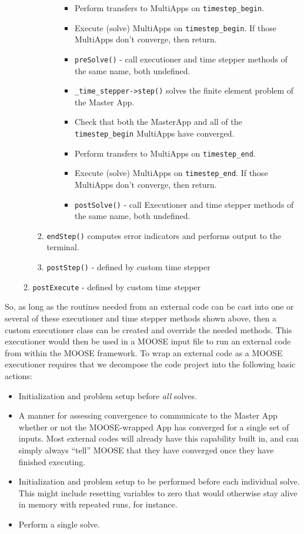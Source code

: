 \documentclass[10pt]{article}
\numberwithin{equation}{section} %
\begin{document}
\begin{enumerate}
\begin{enumerate}
\begin{enumerate}
\begin{enumerate}
				\begin{itemize}
				\item Perform transfers to MultiApps on {\tt timestep\_begin}.
				\item Execute (solve) MultiApps on {\tt timestep\_begin}. If those MultiApps don't converge, then return.
				\item {\tt preSolve()} - call executioner and time stepper methods of the same name, both undefined.
				\item {\tt \_time\_stepper->step()} solves the finite element problem of the Master App. 
				\item Check that both the MasterApp and all of the {\tt timestep\_begin} MultiApps have converged.
				\item Perform transfers to MultiApps on {\tt timestep\_end}.
				\item Execute (solve) MultiApps on {\tt timestep\_end}. If those MultiApps don't converge, then return.
				\item {\tt postSolve()} - call Executioner and time stepper methods of the same name, both undefined.
				\end{itemize}
			\end{enumerate}
		\item {\tt endStep()} computes error indicators and performs output to the terminal. 
		\item {\tt postStep()} - defined by custom time stepper
		\end{enumerate}
	\item {\tt postExecute} - defined by custom time stepper
	\end{enumerate}
\end{enumerate}

So, as long as the routines needed from an external code can be cast into one or several of these executioner and time stepper methods shown above, then a custom executioner class can be created and override the needed methods. This executioner would then be used in a MOOSE input file to run an external code from within the MOOSE framework. To wrap an external code as a MOOSE executioner requires that we decompose the code project into the following basic actions:

\begin{itemize}
\item Initialization and problem setup before {\it all} solves.
\item A manner for assessing convergence to communicate to the Master App whether or not the MOOSE-wrapped App has converged for a single set of inputs. Most external codes will already have this capability built in, and can simply always ``tell'' MOOSE that they have converged once they have finished executing.
\item Initialization and problem setup to be performed before each individual solve. This might include resetting variables to zero that would otherwise stay alive in memory with repeated runs, for instance.
\item Perform a single solve.
\end{itemize}
\end{document}
